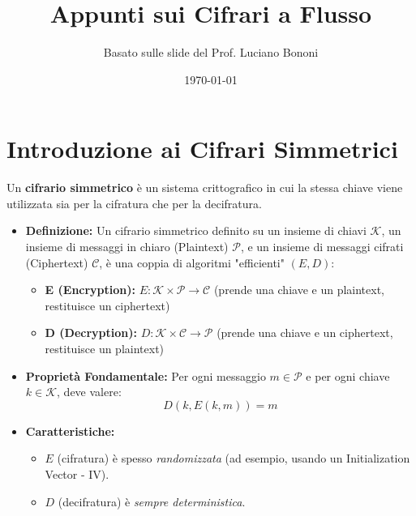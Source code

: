 \documentclass{article}
\title{\textbf{Appunti sui Cifrari a Flusso}}
\author{Basato sulle slide del Prof. Luciano Bononi}
\date{\today}
\begin{document}
\maketitle
\tableofcontents
\newpage

\section{Introduzione ai Cifrari Simmetrici}

Un \textbf{cifrario simmetrico} è un sistema crittografico in cui la stessa chiave viene utilizzata sia per la cifratura che per la decifratura.

\begin{itemize}
    \item \textbf{Definizione:} Un cifrario simmetrico definito su un insieme di chiavi $\mathcal{K}$, un insieme di messaggi in chiaro (Plaintext) $\mathcal{P}$, e un insieme di messaggi cifrati (Ciphertext) $\mathcal{C}$, è una coppia di algoritmi "efficienti" $(E, D)$:
    \begin{itemize}
        \item \textbf{E (Encryption):} $E: \mathcal{K} \times \mathcal{P} \to \mathcal{C}$ (prende una chiave e un plaintext, restituisce un ciphertext)
        \item \textbf{D (Decryption):} $D: \mathcal{K} \times \mathcal{C} \to \mathcal{P}$ (prende una chiave e un ciphertext, restituisce un plaintext)
    \end{itemize}
    \item \textbf{Proprietà Fondamentale:} Per ogni messaggio $m \in \mathcal{P}$ e per ogni chiave $k \in \mathcal{K}$, deve valere:
    \[ D(k, E(k,m)) = m \]
    \item \textbf{Caratteristiche:}
    \begin{itemize}
        \item $E$ (cifratura) è spesso \textit{randomizzata} (ad esempio, usando un Initialization Vector - IV).
        \item $D$ (decifratura) è \textit{sempre deterministica}.
    \end{itemize}
\end{itemize}
\end{document}
